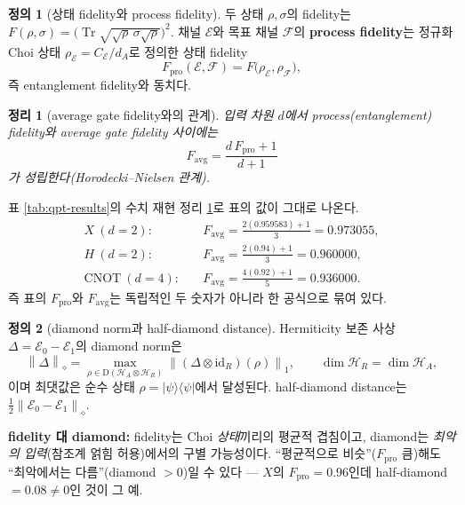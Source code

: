 \documentclass[11pt,a4paper]{article}
\newcommand{\E}{\mathcal{E}}
\newcommand{\Hcal}{\mathcal{H}}
\newcommand{\Tr}{\operatorname{Tr}}
\newcommand{\id}{\mathrm{id}}
\newcommand{\Dens}{\mathrm{D}}
\newcommand{\diamondnorm}[1]{\left\lVert #1 \right\rVert_{\diamond}}
\newcommand{\onenorm}[1]{\left\lVert #1 \right\rVert_{1}}
\theoremstyle{definition}
\newtheorem{definition}{정의}[section]
\theoremstyle{plain}
\newtheorem{theorem}{정리}[section]
\theoremstyle{remark}
\begin{document}
\begin{definition}[상태 fidelity와 process fidelity]
두 상태 $\rho,\sigma$의 fidelity는 $F(\rho,\sigma)=\big(\Tr\sqrt{\sqrt\rho\,\sigma\sqrt\rho}\big)^2$. 채널 $\E$와 목표 채널 $\mathcal F$의 \textbf{process fidelity}는 정규화 Choi 상태 $\rho_\E=C_\E/d_A$로 정의한 상태 fidelity
\[
F_{\mathrm{pro}}(\E,\mathcal F)=F\!\big(\rho_\E,\rho_{\mathcal F}\big),
\]
즉 entanglement fidelity와 동치다.
\end{definition}

\begin{theorem}[average gate fidelity와의 관계]\label{thm:favg}
입력 차원 $d$에서 process(entanglement) fidelity와 average gate fidelity 사이에는
\[
\boxed{\,F_{\mathrm{avg}}=\dfrac{d\,F_{\mathrm{pro}}+1}{d+1}\,}
\]
가 성립한다(Horodecki--Nielsen 관계).
\end{theorem}

\begin{mathbox}{표 \ref{tab:qpt-results}의 수치 재현}
정리 \ref{thm:favg}로 표의 값이 그대로 나온다.
\begin{align*}
X\ (d=2):&\quad F_{\mathrm{avg}}=\tfrac{2(0.959583)+1}{3}=0.973055,\\
H\ (d=2):&\quad F_{\mathrm{avg}}=\tfrac{2(0.94)+1}{3}=0.960000,\\
\mathrm{CNOT}\ (d=4):&\quad F_{\mathrm{avg}}=\tfrac{4(0.92)+1}{5}=0.936000.
\end{align*}
즉 표의 $F_{\mathrm{pro}}$와 $F_{\mathrm{avg}}$는 독립적인 두 숫자가 아니라 한 공식으로 묶여 있다.
\end{mathbox}

\begin{definition}[diamond norm과 half-diamond distance]
Hermiticity 보존 사상 $\Delta=\E_0-\E_1$의 diamond norm은
\[
\diamondnorm{\Delta}=\max_{\rho\in\Dens(\Hcal_A\otimes\Hcal_R)}\onenorm{(\Delta\otimes\id_R)(\rho)},\qquad \dim\Hcal_R=\dim\Hcal_A,
\]
이며 최댓값은 순수 상태 $\rho=|\psi\rangle\langle\psi|$에서 달성된다. half-diamond distance는 $\tfrac12\diamondnorm{\E_0-\E_1}$.
\end{definition}

\begin{intuitionbox}
\textbf{fidelity 대 diamond:} fidelity는 Choi \emph{상태}끼리의 평균적 겹침이고, diamond는 \emph{최악의 입력}(참조계 얽힘 허용)에서의 구별 가능성이다. ``평균적으로 비슷''($F_{\mathrm{pro}}$ 큼)해도 ``최악에서는 다름''(diamond $>0$)일 수 있다 --- $X$의 $F_{\mathrm{pro}}=0.96$인데 half-diamond $=0.08\neq0$인 것이 그 예.
\end{intuitionbox}
\end{document}
